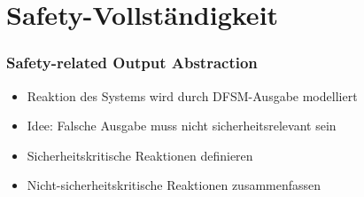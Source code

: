 \documentclass[10pt]{beamer}
\begin{document}
\begin{frame}
\begin{columns}[T]
\begin{column}{.70\textwidth}
\end{column}%

\end{columns}

\end{frame}

\section{Safety-Vollständigkeit}
\begin{frame}
\frametitle{Safety-related Output Abstraction}
\begin{itemize}
  \item<1-> Reaktion des Systems wird durch DFSM-Ausgabe modelliert
  \item<2-> Idee: Falsche Ausgabe muss nicht sicherheitsrelevant sein
  \item<3-> Sicherheitskritische Reaktionen definieren
  \item<4-> Nicht-sicherheitskritische Reaktionen zusammenfassen
\end{itemize}
\end{frame}
\end{document}
